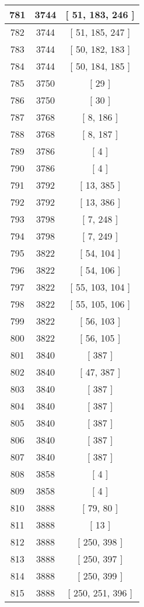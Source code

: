 \begin{center}
\begin{longtable}[H]{|| c c c ||}
\hline
781 & 3744 & [ 51, 183, 246 ] \\ 
\hline
782 & 3744 & [ 51, 185, 247 ] \\ 
\hline
783 & 3744 & [ 50, 182, 183 ] \\ 
\hline
784 & 3744 & [ 50, 184, 185 ] \\ 
\hline
785 & 3750 & [ 29 ] \\ 
\hline
786 & 3750 & [ 30 ] \\ 
\hline
787 & 3768 & [ 8, 186 ] \\ 
\hline
788 & 3768 & [ 8, 187 ] \\ 
\hline
789 & 3786 & [ 4 ] \\ 
\hline
790 & 3786 & [ 4 ] \\ 
\hline
791 & 3792 & [ 13, 385 ] \\ 
\hline
792 & 3792 & [ 13, 386 ] \\ 
\hline
793 & 3798 & [ 7, 248 ] \\ 
\hline
794 & 3798 & [ 7, 249 ] \\ 
\hline
795 & 3822 & [ 54, 104 ] \\ 
\hline
796 & 3822 & [ 54, 106 ] \\ 
\hline
797 & 3822 & [ 55, 103, 104 ] \\ 
\hline
798 & 3822 & [ 55, 105, 106 ] \\ 
\hline
799 & 3822 & [ 56, 103 ] \\ 
\hline
800 & 3822 & [ 56, 105 ] \\ 
\hline
801 & 3840 & [ 387 ] \\ 
\hline
802 & 3840 & [ 47, 387 ] \\ 
\hline
803 & 3840 & [ 387 ] \\ 
\hline
804 & 3840 & [ 387 ] \\ 
\hline
805 & 3840 & [ 387 ] \\ 
\hline
806 & 3840 & [ 387 ] \\ 
\hline
807 & 3840 & [ 387 ] \\ 
\hline
808 & 3858 & [ 4 ] \\ 
\hline
809 & 3858 & [ 4 ] \\ 
\hline
810 & 3888 & [ 79, 80 ] \\ 
\hline
811 & 3888 & [ 13 ] \\ 
\hline
812 & 3888 & [ 250, 398 ] \\ 
\hline
813 & 3888 & [ 250, 397 ] \\ 
\hline
814 & 3888 & [ 250, 399 ] \\ 
\hline
815 & 3888 & [ 250, 251, 396 ] \\ 

\end{longtable}
\end{center}
